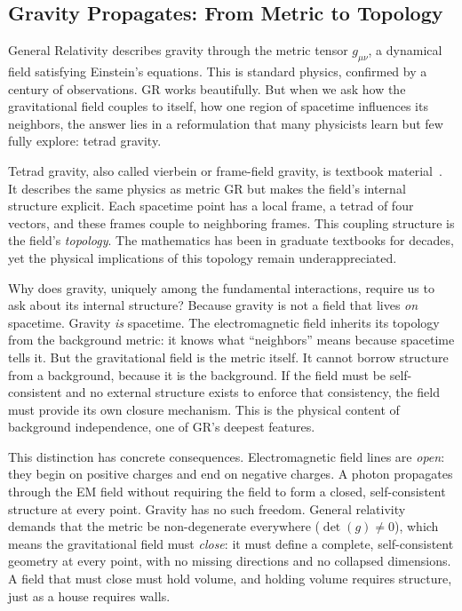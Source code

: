 \documentclass[aps,prd,preprint,superscriptaddress,showpacs,preprintnumbers,amsmath,amssymb,nofootinbib]{revtex4-2}
\begin{document}
\subsection{Gravity Propagates: From Metric to Topology}
\label{subsec:propagates}

General Relativity describes gravity through the metric tensor $g_{\mu\nu}$, a dynamical field satisfying Einstein's equations. This is standard physics, confirmed by a century of observations. GR works beautifully. But when we ask how the gravitational field couples to itself, how one region of spacetime influences its neighbors, the answer lies in a reformulation that many physicists learn but few fully explore: tetrad gravity.

Tetrad gravity, also called vierbein or frame-field gravity, is textbook material~\cite{mtw1973,wald1984}. It describes the same physics as metric GR but makes the field's internal structure explicit. Each spacetime point has a local frame, a tetrad of four vectors, and these frames couple to neighboring frames. This coupling structure is the field's \emph{topology}. The mathematics has been in graduate textbooks for decades, yet the physical implications of this topology remain underappreciated.

Why does gravity, uniquely among the fundamental interactions, require us to ask about its internal structure? Because gravity is not a field that lives \emph{on} spacetime. Gravity \emph{is} spacetime. The electromagnetic field inherits its topology from the background metric: it knows what ``neighbors'' means because spacetime tells it. But the gravitational field is the metric itself. It cannot borrow structure from a background, because it is the background. If the field must be self-consistent and no external structure exists to enforce that consistency, the field must provide its own closure mechanism. This is the physical content of background independence, one of GR's deepest features.

This distinction has concrete consequences. Electromagnetic field lines are \emph{open}: they begin on positive charges and end on negative charges. A photon propagates through the EM field without requiring the field to form a closed, self-consistent structure at every point. Gravity has no such freedom. General relativity demands that the metric be non-degenerate everywhere ($\det(g) \neq 0$), which means the gravitational field must \emph{close}: it must define a complete, self-consistent geometry at every point, with no missing directions and no collapsed dimensions. A field that must close must hold volume, and holding volume requires structure, just as a house requires walls.
\end{document}
